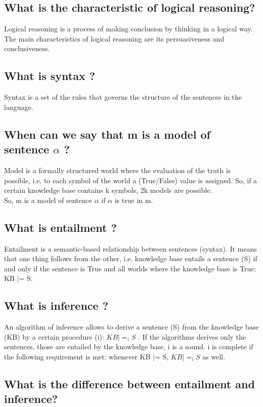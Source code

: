 \documentclass[a4paper, 12pt]{article}
\begin{document}
\subsection{What is the characteristic of logical reasoning?}
Logical reasoning is a process of making conclusion by thinking in a logical way.
The main characteristics of logical reasoning are its persuasiveness and conclusiveness.

\subsection{What is syntax ?}

Syntax is a set of the rules that governs the structure of the sentences in the language.

\subsection{When can we say that m is a model of sentence $\alpha$ ?}

Model is a formally structured world where the evaluation of the truth is possible, i.e. to
each symbol of the world a (True/False) value is assigned. So, if a certain knowledge base contains k symbols, 2k models are possible.\\
So, m is a model of sentence $\alpha$ if $\alpha$ is true in m.

\subsection{What is entailment ?}

Entailment is a semantic-based relationship between sentences (syntax). It means that one thing follows from the other, i.e. knowledge base entails a sentence (S) if and only if the sentence is True and all worlds where the knowledge base is True: KB $|$= S.

\subsection{What is inference ?}

An algorithm of inference allows to derive a sentence (S) from the knowledge base (KB) by a certain procedure (i):  $KB |=_i S$ . If the algorithms derives only the sentences, those are entailed by the knowledge base, i is a sound. i is complete if the following requirement is met: whenever KB $|$= S, $KB |=_i S$ as well.


\subsection{What is the difference between entailment and inference?}
\end{document}
